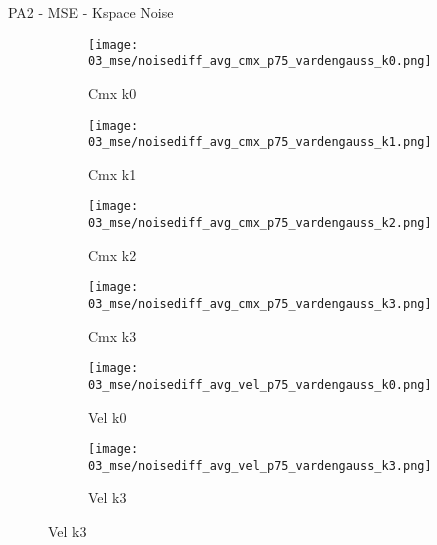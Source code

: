 \documentclass{beamer}
\begin{document}
\begin{frame}{PA2 - MSE - Kspace Noise}{}
\begin{figure}
\begin{subfigure}{0.24\textwidth}
\texttt{[image: 03\_mse/noisediff\_avg\_cmx\_p75\_vardengauss\_k0.png]}
\vspace{-20pt}
\caption*{\tiny Cmx k0}
\end{subfigure}
\begin{subfigure}{0.24\textwidth}
\texttt{[image: 03\_mse/noisediff\_avg\_cmx\_p75\_vardengauss\_k1.png]}
\vspace{-20pt}
\caption*{\tiny Cmx k1}
\end{subfigure}
\begin{subfigure}{0.24\textwidth}
\texttt{[image: 03\_mse/noisediff\_avg\_cmx\_p75\_vardengauss\_k2.png]}
\vspace{-20pt}
\caption*{\tiny Cmx k2}
\end{subfigure}
\begin{subfigure}{0.24\textwidth}
\texttt{[image: 03\_mse/noisediff\_avg\_cmx\_p75\_vardengauss\_k3.png]}
\vspace{-20pt}
\caption*{\tiny Cmx k3}
\end{subfigure}

\begin{subfigure}{0.49\textwidth}
\texttt{[image: 03\_mse/noisediff\_avg\_vel\_p75\_vardengauss\_k0.png]}
\vspace{-20pt}
\caption*{\tiny Vel k0}
\end{subfigure}
\begin{subfigure}{0.49\textwidth}
\texttt{[image: 03\_mse/noisediff\_avg\_vel\_p75\_vardengauss\_k3.png]}
\vspace{-20pt}
\caption*{\tiny Vel k3}
\end{subfigure}
\end{figure}
\end{frame}
\end{document}
